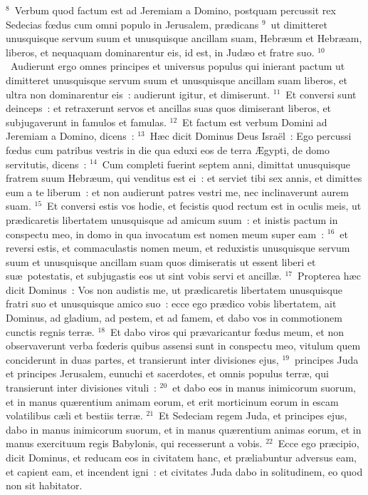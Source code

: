 ${}^{8}$~Verbum quod factum est ad Jeremiam a Domino, postquam percussit rex Sedecias fœdus cum omni populo in Jerusalem, pr\ae dicans
${}^{9}$~ut dimitteret unusquisque servum suum et unusquisque ancillam suam, Hebr\ae um et Hebr\ae am, liberos, et nequaquam dominarentur eis, id est, in Jud\ae o et fratre suo.
${}^{10}$~Audierunt ergo omnes principes et universus populus qui inierant pactum ut dimitteret unusquisque servum suum et unusquisque ancillam suam liberos, et ultra non dominarentur eis~: audierunt igitur, et dimiserunt.
${}^{11}$~Et conversi sunt deinceps~: et retraxerunt servos et ancillas suas quos dimiserant liberos, et subjugaverunt in famulos et famulas.
${}^{12}$~Et factum est verbum Domini ad Jeremiam a Domino, dicens~:
${}^{13}$~H\ae c dicit Dominus Deus Isra\"el~: Ego percussi fœdus cum patribus vestris in die qua eduxi eos de terra \AE gypti, de domo servitutis, dicens~:
${}^{14}$~Cum completi fuerint septem anni, dimittat unusquisque fratrem suum Hebr\ae um, qui venditus est ei~: et serviet tibi sex annis, et dimittes eum a te liberum~: et non audierunt patres vestri me, nec inclinaverunt aurem suam.
${}^{15}$~Et conversi estis vos hodie, et fecistis quod rectum est in oculis meis, ut pr\ae dicaretis libertatem unusquisque ad amicum suum~: et inistis pactum in conspectu meo, in domo in qua invocatum est nomen meum super eam~:
${}^{16}$~et reversi estis, et commaculastis nomen meum, et reduxistis unusquisque servum suum et unusquisque ancillam suam quos dimiseratis ut essent liberi et su\ae\ potestatis, et subjugastis eos ut sint vobis servi et ancill\ae .
${}^{17}$~Propterea h\ae c dicit Dominus~: Vos non audistis me, ut pr\ae dicaretis libertatem unusquisque fratri suo et unusquisque amico suo~: ecce ego pr\ae dico vobis libertatem, ait Dominus, ad gladium, ad pestem, et ad famem, et dabo vos in commotionem cunctis regnis terr\ae .
${}^{18}$~Et dabo viros qui pr\ae varicantur fœdus meum, et non observaverunt verba fœderis quibus assensi sunt in conspectu meo, vitulum quem conciderunt in duas partes, et transierunt inter divisiones ejus,
${}^{19}$~principes Juda et principes Jerusalem, eunuchi et sacerdotes, et omnis populus terr\ae , qui transierunt inter divisiones vituli~:
${}^{20}$~et dabo eos in manus inimicorum suorum, et in manus qu\ae rentium animam eorum, et erit morticinum eorum in escam volatilibus c\ae li et bestiis terr\ae .
${}^{21}$~Et Sedeciam regem Juda, et principes ejus, dabo in manus inimicorum suorum, et in manus qu\ae rentium animas eorum, et in manus exercituum regis Babylonis, qui recesserunt a vobis.
${}^{22}$~Ecce ego pr\ae cipio, dicit Dominus, et reducam eos in civitatem hanc, et pr\ae liabuntur adversus eam, et capient eam, et incendent igni~: et civitates Juda dabo in solitudinem, eo quod non sit habitator.
